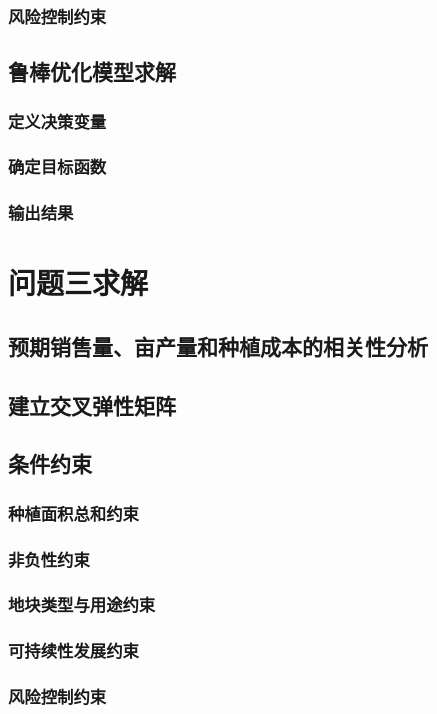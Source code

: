 \documentclass[12pt]{ctexart}
\begin{document}
	\subsubsection{风险控制约束}
	\subsection{鲁棒优化模型求解}
	\subsubsection{定义决策变量}
	\subsubsection{确定目标函数}
	\subsubsection{输出结果}
	
	\newpage
	\section{问题三求解}
	\subsection{预期销售量、亩产量和种植成本的相关性分析}
	\subsection{建立交叉弹性矩阵}
	\subsection{条件约束}
	\subsubsection{种植面积总和约束}
	\subsubsection{非负性约束}
	\subsubsection{地块类型与用途约束}
	\subsubsection{可持续性发展约束}
	\subsubsection{风险控制约束}
\end{document}
